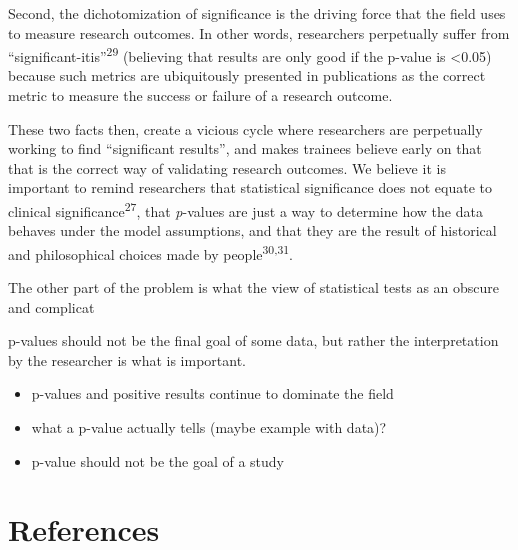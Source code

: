 \documentclass[smallextended]{svjour3}       %
\begin{document}
Second, the dichotomization of significance is the driving force that
the field uses to measure research outcomes. In other words, researchers
perpetually suffer from ``significant-itis''\textsuperscript{29}
(believing that results are only good if the p-value is \textless0.05)
because such metrics are ubiquitously presented in publications as the
correct metric to measure the success or failure of a research outcome.

These two facts then, create a vicious cycle where researchers are
perpetually working to find ``significant results'', and makes trainees
believe early on that that is the correct way of validating research
outcomes. We believe it is important to remind researchers that
statistical significance does not equate to clinical
significance\textsuperscript{27}, that \emph{p}-values are just a way to
determine how the data behaves under the model assumptions, and that
they are the result of historical and philosophical choices made by
people\textsuperscript{30,31}.

The other part of the problem is what the view of statistical tests as
an obscure and complicat

p-values should not be the final goal of some data, but rather the
interpretation by the researcher is what is important.

\begin{itemize}
\item
  p-values and positive results continue to dominate the field
\item
  what a p-value actually tells (maybe example with data)?
\item
  p-value should not be the goal of a study
\end{itemize}

\hypertarget{references}{%
\section*{References}\label{references}}
\end{document}
